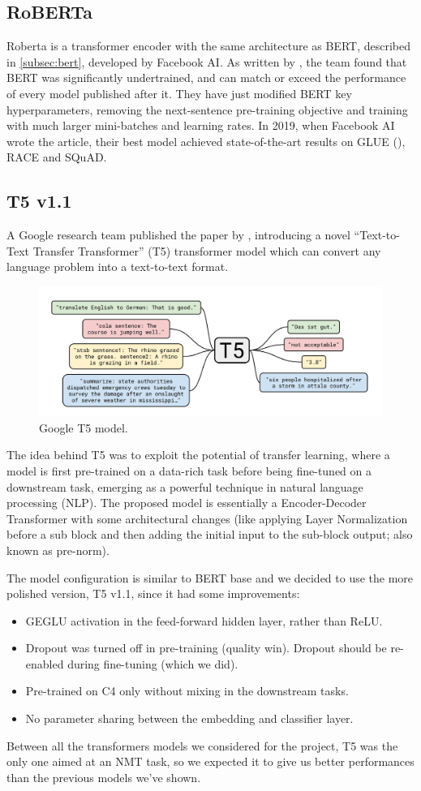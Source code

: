 \subsection{RoBERTa}
Roberta is a transformer encoder with the same architecture as BERT, described in \ref{subsec:bert}, developed by Facebook AI. As written by \cite{liu2019roberta}, the team found that BERT was significantly undertrained, and can match or exceed the performance of every model published after it. They have just modified BERT key hyperparameters, removing the next-sentence pre-training objective and training with much larger mini-batches and learning rates. In 2019, when Facebook AI wrote the article, their best model achieved state-of-the-art results on GLUE (\cite{wang2018glue}), RACE and SQuAD.
\subsection{T5 v1.1}
A Google research team published the paper by \cite{raffel2019exploring}, introducing a novel “Text-to-Text Transfer Transformer” (T5) transformer model which can convert any language problem into a text-to-text format.
\begin{figure}[H]
    \centering
    \includegraphics[width = .7\linewidth]{images/google_T5.png}
    \caption{Google T5 model.}
    \label{fig:google_t5}
\end{figure}
The idea behind T5 was to exploit the potential of transfer learning, where a model is first pre-trained on a data-rich task before being fine-tuned on a downstream task, emerging as a powerful technique in natural language processing (NLP). The proposed model is essentially a Encoder-Decoder Transformer with some architectural changes (like applying Layer Normalization before a sub block and then adding the initial input to the sub-block output; also known as pre-norm).
\vspace{3mm}

The model configuration is similar to BERT base and we decided to use the more polished version, T5 v1.1, since it had some improvements:
\begin{itemize}
    \item GEGLU activation in the feed-forward hidden layer, rather than ReLU.
    \item Dropout was turned off in pre-training (quality win). Dropout should be re-enabled during fine-tuning (which we did).
    \item Pre-trained on C4 only without mixing in the downstream tasks.
    \item No parameter sharing between the embedding and classifier layer.
\end{itemize}
Between all the transformers models we considered for the project, T5 was the only one aimed at an NMT task, so we expected it to give us better performances than the previous models we've shown.